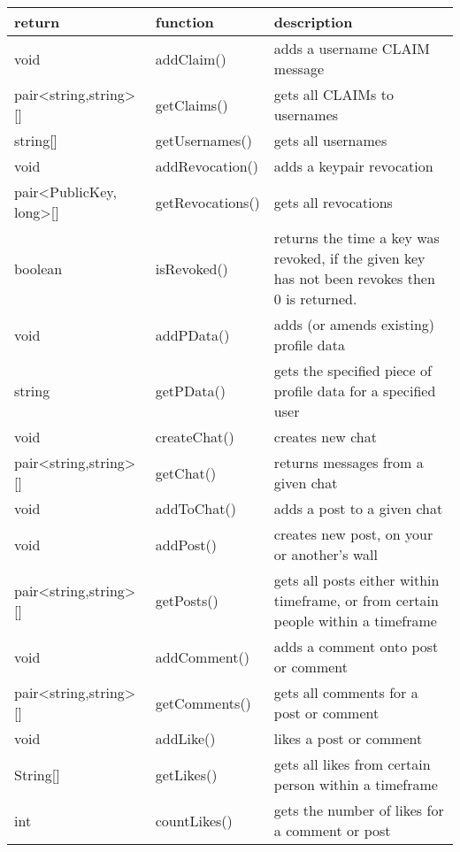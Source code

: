 \begin{table}[h]
    \centering
    \begin{tabular}{p{3cm}p{3cm}p{9cm}}
    return                & function       & description\\ \hline
    
    void                  & addClaim()     & adds a username CLAIM message\\
    pair<string,string>[] & getClaims()    & gets all CLAIMs to usernames\\
    string[]              & getUsernames() & gets all usernames\\
    
    void                    & addRevocation()  & adds a keypair revocation\\
    pair<PublicKey, long>[] & getRevocations() & gets all revocations\\
    boolean                 & isRevoked()      & returns the time a key was revoked, if the given key has not been revokes then 0 is returned.\\
    
    void   & addPData() & adds (or amends existing) profile data\\
    string & getPData() & gets the specified piece of profile data for a specified user\\
    
    void                  & createChat() & creates new chat\\
    pair<string,string>[] & getChat()    & returns messages from a given chat\\
    void                  & addToChat()  & adds a post to a given chat\\
    
    void                  & addPost()  & creates new post, on your or another's wall\\
    pair<string,string>[] & getPosts() & gets all posts either within timeframe, or from certain people within a timeframe\\
    
    void                  &  addComment() & adds a comment onto post or comment\\
    pair<string,string>[] & getComments() & gets all comments for a post or comment\\
    
    void     & addLike() & likes a post or comment\\
    String[] & getLikes() & gets all likes from certain person within a timeframe\\
    int      & countLikes() & gets the number of likes for a comment or post\\
    

\end{tabular}
\end{table}
